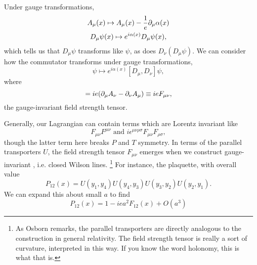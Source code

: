 Under gauge transformations,
\begin{gather}
    A_\mu(x) \mapsto A_\mu(x) -\frac{1}{e} \partial_\mu \alpha(x)\\
    D_\mu \psi(x) \mapsto e^{i\alpha(x)}D_\mu \psi(x),
\end{gather}
which tells us that $D_\mu \psi$ transforms like $\psi$, as does $D_\nu (D_\mu \psi)$. We can consider how the commutator transforms under gauge transformations,
\begin{equation}
    [D_\mu,D_\nu]\psi \mapsto e^{i\alpha(x)} [D_\mu,D_\nu] \psi,
\end{equation}
where
\begin{equation}
    [D_\mu,D_\nu]=ie(\p_\mu A_\nu - \p_\nu A_\mu)\equiv ie F_{\mu\nu},
\end{equation}
the gauge-invariant field strength tensor.

Generally, our Lagrangian can contain terms which are Lorentz invariant like
\begin{equation}
    F_{\mu\nu} F^{\mu\nu}\text{ and } i\epsilon^{\mu\nu\rho\sigma} F_{\mu\nu} F_{\rho\sigma},
\end{equation}
though the latter term here breaks $P$ and $T$ symmetry. In terms of the parallel transporters $U$, the field strength tensor $F_{\mu\nu}$ emerges when we construct gauge-invariant , i.e. closed Wilson lines.%
    \footnote{As Osborn remarks, the parallel transporters are directly analogous to the construction in general relativity. The field strength tensor is really a sort of curvature, interpreted in this way. If you know the word holonomy, this is what that is.}
For instance, the plaquette, with overall value
\begin{equation}
    P_{12}(x)=U(y_1,y_4)U(y_4,y_3) U(y_3,y_2) U(y_2,y_1).
\end{equation}
We can expand this about small $a$ to find
\begin{equation}
    P_{12}(x)=1-iea^2 F_{12}(x)+ O(a^3)
\end{equation}

